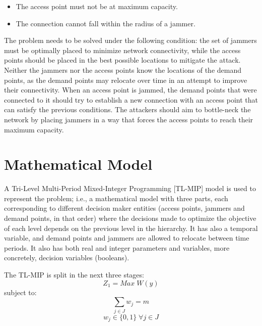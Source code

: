 \documentclass[runningheads]{llncs}
\begin{document}
\begin{itemize}
    \item The access point must not be at maximum capacity.
    \item The connection cannot fall within the radius of a jammer.
\end{itemize}

The problem needs to be solved under the following condition: the set of jammers must be optimally placed to minimize network connectivity, while the access points should be placed in the best possible locations to mitigate the attack. Neither the jammers nor the access points know the locations of the demand points, as the demand points may relocate over time in an attempt to improve their connectivity.
When an access point is jammed, the demand points that were connected to it should try to establish a new connection with an access point that can satisfy the previous conditions. The attackers should aim to bottle-neck the network by placing jammers in a way that forces the access points to reach their maximum capacity.


\section{Mathematical Model}

A Tri-Level Multi-Period Mixed-Integer Programming [TL-MIP] model is used to represent the problem; i.e., a mathematical model with three parts, each corresponding to different decision maker entities (access points, jammers and demand points, in that order) where the decisions made to optimize the objective of each level depends on the previous level in the hierarchy. It has also a temporal variable, and demand points and jammers are allowed to relocate between time periods. It also has both real and integer parameters and variables, more concretely, decision variables (booleans).

The TL-MIP is split in the next three stages:
\small
\begin{equation}\tag{1a}
    Z_1 = Max \; W(y)
\end{equation}
subject to:
\begin{equation}\tag{1b}
    \sum_{j \in J} w_j = m
\end{equation}
\begin{equation}\tag{1c}
    w_j \in \{0,1\} \; \forall j \in J
\end{equation}
\end{document}
